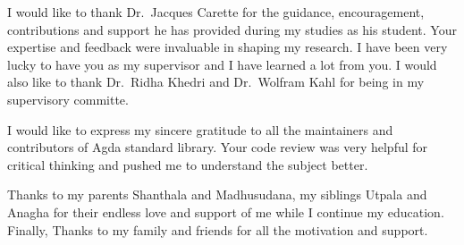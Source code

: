 
I would like to thank Dr.\  Jacques Carette for the guidance, encouragement,
contributions and support he has provided during my studies as his student. Your
expertise and feedback were invaluable in shaping my research. I have been very
lucky to have you as my supervisor and I have learned a lot from you. I would
also like to thank Dr.\  Ridha Khedri and Dr.\ Wolfram Kahl for being in my
supervisory committe.

I would like to express my sincere gratitude to all the maintainers and
contributors of Agda standard library. Your code review was very helpful for
critical thinking and pushed me to understand the subject better. 

Thanks to my parents Shanthala and Madhusudana, my siblings Utpala and Anagha
for their endless love and support of me while I continue my education. Finally,
Thanks to my family and friends for all the motivation and support.
